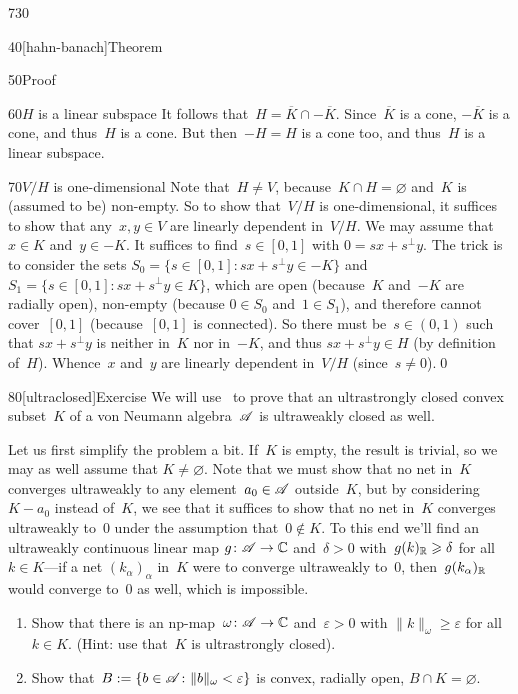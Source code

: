 \begin{parsec}{730}
\begin{point}{40}[hahn-banach]{Theorem}
\begin{point}{50}{Proof}
\begin{point}{60}{$H$ is a linear subspace}
It follows that~$H=\overline{K}\cap -\overline{K}$.
Since~$\overline{K}$ is a cone, $-\overline{K}$ is a cone,
and thus~$H$ is a cone.  But then~$-H=H$ is a cone too,
and thus~$H$ is a linear subspace.
\end{point}
\begin{point}{70}{$V/H$ is one-dimensional}%
Note that~$H\neq V$, because~$K\cap H=\varnothing$
and~$K$ is (assumed to be) non-empty.
So to show that~$V/H$ is one-dimensional,
it suffices to show that
any~$x,y\in V$ 
 are linearly dependent in~$V/H$.
We may assume that~$x\in K$ and~$y\in -K$.
It suffices to find~$s\in [0,1]$ with $0=sx+s^\perp y$.
The trick is to consider the sets
 $S_0 = \{s\in [0,1]\colon sx+s^\perp y \in -K\}$
and~$S_1 = \{s\in [0,1]\colon sx+s^\perp y \in K\}$,
which are open (because~$K$ and~$-K$ are radially open),
non-empty (because $0\in S_0$ and~$1\in S_1$),
and therefore cannot cover~$[0,1]$
(because~$[0,1]$ is connected).
So there must be~$s\in (0,1)$ 
such that
$sx+s^\perp y $ 
is neither in~$K$
nor in~$-K$,
and thus $sx+s^\perp y \in H$ (by definition of~$H$).
Whence~$x$ and~$y$ are linearly dependent in~$V/H$
(since~$s\neq 0$).\qed
\end{point}
\end{point}
\end{point}
\begin{point}{80}[ultraclosed]{Exercise}%
We will use~
to prove that 
an ultrastrongly closed convex subset~$K$ of a 
von Neumann algebra~$\mathscr{A}$
is ultraweakly closed as well.

Let us first simplify the problem a bit.
If~$K$ is empty, the result is trivial,
so we may as well assume that $K\neq \varnothing$.
Note that we must show that no net in~$K$ converges ultraweakly
to any element~$a_0\in\mathscr{A}$ outside~$K$,
but by considering~$K-a_0$ instead of~$K$,
we see that it suffices to show that
no net in~$K$ converges ultraweakly to~$0$
under the assumption that~$0\notin K$.
To this end we'll find an ultraweakly continuous linear map
$g\colon \mathscr{A}\to \mathbb{C}$ and~$\delta>0$ 
with~$g(k)_{\mathbb{R}}\geqslant \delta$ for all~$k\in K$---if
a net $(k_\alpha)_\alpha$ in~$K$ were to converge ultraweakly to~$0$,
then~$g(k_\alpha)_{\mathbb{R}}$ would converge to~$0$ as well,
which is impossible.
\begin{enumerate}
\item
	Show that 
	there is an np-map~$\omega \colon\mathscr{A}\to\mathbb{C}$
	and~$\varepsilon>0$ 
	with $\|k\|_\omega \geq \varepsilon$ for all~$k\in K$.
	(Hint: use that~$K$ is ultrastrongly closed).
\item
	Show that~$B:= \{ b\in \mathscr{A}\colon \|b\|_\omega < \varepsilon\}$
	 is convex, radially open, $B\cap K=\varnothing$.


\end{enumerate}
\end{point}
\end{parsec}
